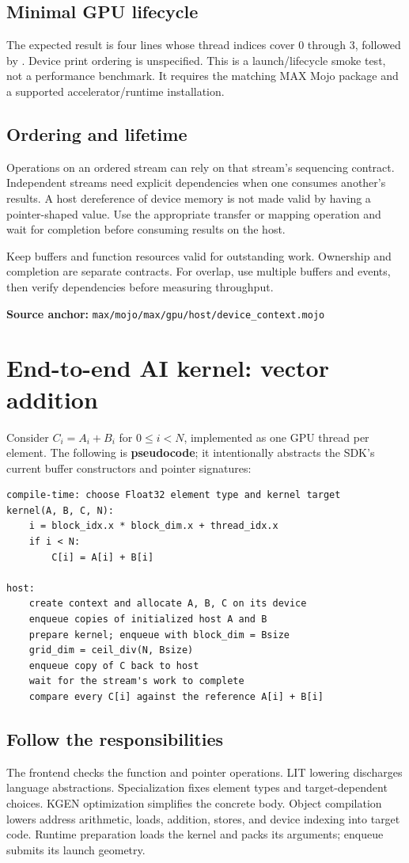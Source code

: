 \documentclass[11pt,a4paper]{article}
\newcommand{\code}[1]{\texttt{\detokenize{#1}}}
\newcommand{\src}[1]{\par{\small\textbf{Source anchor:} \nolinkurl{#1}}\par}
\newcommand{\chapterpage}[1]{\clearpage\section{#1}}
\begin{document}
\subsection{Minimal GPU lifecycle}

The expected result is four lines whose thread indices cover 0 through 3, followed by \code{complete}. Device print ordering is unspecified. This is a launch/lifecycle smoke test, not a performance benchmark. It requires the matching MAX Mojo package and a supported accelerator/runtime installation.

\subsection{Ordering and lifetime}
Operations on an ordered stream can rely on that stream's sequencing contract. Independent streams need explicit dependencies when one consumes another's results. A host dereference of device memory is not made valid by having a pointer-shaped value. Use the appropriate transfer or mapping operation and wait for completion before consuming results on the host.

Keep buffers and function resources valid for outstanding work. Ownership and completion are separate contracts. For overlap, use multiple buffers and events, then verify dependencies before measuring throughput.
\src{max/mojo/max/gpu/host/device_context.mojo}

\chapterpage{End-to-end AI kernel: vector addition}
Consider \(C_i=A_i+B_i\) for \(0\le i<N\), implemented as one GPU thread per element. The following is \textbf{pseudocode}; it intentionally abstracts the SDK's current buffer constructors and pointer signatures:
\begin{lstlisting}
compile-time: choose Float32 element type and kernel target
kernel(A, B, C, N):
    i = block_idx.x * block_dim.x + thread_idx.x
    if i < N:
        C[i] = A[i] + B[i]

host:
    create context and allocate A, B, C on its device
    enqueue copies of initialized host A and B
    prepare kernel; enqueue with block_dim = Bsize
    grid_dim = ceil_div(N, Bsize)
    enqueue copy of C back to host
    wait for the stream's work to complete
    compare every C[i] against the reference A[i] + B[i]
\end{lstlisting}

\subsection{Follow the responsibilities}
The frontend checks the function and pointer operations. LIT lowering discharges language abstractions. Specialization fixes element types and target-dependent choices. KGEN optimization simplifies the concrete body. Object compilation lowers address arithmetic, loads, addition, stores, and device indexing into target code. Runtime preparation loads the kernel and packs its arguments; enqueue submits its launch geometry.
\end{document}
